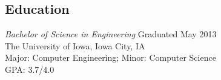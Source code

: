 \documentclass[line,margin]{res}
\begin{document}
\begin{resume}

		\section{Education}
            {\sl Bachelor of Science in Engineering} \hfill Graduated May 2013 \\
                The University of Iowa, Iowa City, IA \\
                Major: Computer Engineering; Minor: Computer Science \\ 
                GPA: 3.7/4.0    


\end{resume}
\end{document}
